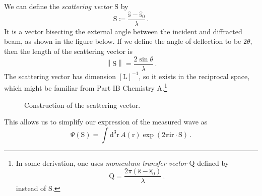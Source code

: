\documentclass{article}
\theoremstyle{plain}\theoremheaderfont{\normalfont\itshape}\theorembodyfont{\rmfamily}\theoremseparator{.}\newtheorem*{rem}{Remark}\newtheorem*{ex}{Example}\newtheorem*{proof}{Proof}\newtheorem*{altp}{Alternative proof}
\theoremstyle{plain}\theoremheaderfont{\normalfont\bfseries}\theorembodyfont{\rmfamily}\theoremseparator{.}\newtheorem{thm}{Theorem}[section]\newtheorem{lem}[thm]{Lemma}\newtheorem{prop}[thm]{Proposition}\newtheorem*{cor}{Corollary}\newtheorem{defn}[thm]{Definition}\newtheorem{clm}[thm]{Claim}\newtheorem{clminproof}{Claim}\newtheorem*{law}{Law}\newtheorem{pos}[thm]{Postulate}
\theoremstyle{break}\theoremheaderfont{\normalfont\itshape}\theorembodyfont{\rmfamily}\theoremseparator{.\medskip}\newtheorem*{proofskip}{Proof}\newtheorem*{exs}{Examples}\newtheorem*{rems}{Remarks}
\theoremstyle{break}\theoremheaderfont{\normalfont\bfseries}\theorembodyfont{\rmfamily}\theoremseparator{.\medskip}\newtheorem{lemskip}[thm]{Lemma}\newtheorem{defnskip}[thm]{Definition}\newtheorem{propskip}[thm]{Proposition}\newtheorem{thmskip}[thm]{Theorem}
\numberwithin{equation}{section}
\newcommand{\ii}{\mathrm{i}}
\newcommand{\dd}[2][]{\mathrm{d}^{#1} #2\,}
\newcommand{\vb}[1]{\bm{\mathrm{#1}}}
\newcommand{\vu}[1]{\hat{\bm{\mathrm{#1}}}}
\newcommand{\vdot}{\,\bm{\mathrm{\cdot}}\,}
\newcommand{\norm}[1]{\left\| #1 \right\|}
\begin{document}
    We can define the \textit{scattering vector} \(\vb{S}\) by
    \begin{equation}
        \vb{S}\coloneqq\frac{\vu{s}-\vu{s}_0}{\lambda}\,.
    \end{equation}
    It is a vector bisecting the external angle between the incident and diffracted beam, as shown in the figure below. If we define the angle of deflection to be \(2\theta\), then the length of the scattering vector is
    \begin{equation}
        \norm{\vb{S}}=\frac{2\sin\theta}{\lambda}\,.
    \end{equation}
    The scattering vector has dimension \([\mathrm{L}]^{-1}\), so it exists in the reciprocal space, which might be familiar from Part IB Chemistry A.\footnote{In some derivation, one uses \textit{momentum transfer vector} \(\vb{Q}\) defined by
    \begin{equation}
        \vb{Q}=\frac{2\pi(\vu{s}-\vu{s}_0)}{\lambda}\,.
    \end{equation}
    instead of \(\vb{S}\).}
    \begin{figure}[ht!]
        \centering
        \caption{Construction of the scattering vector.}
    \end{figure}
    
    This allows us to simplify our expression of the measured wave as
    \begin{equation}
        \Psi(\vb{S})=\int\dd[3]{\vb{r}}A(\vb{r})\exp\left(2\pi \ii\vb{r}\vdot\vb{S}\right)\,.
    \end{equation}
\end{document}
